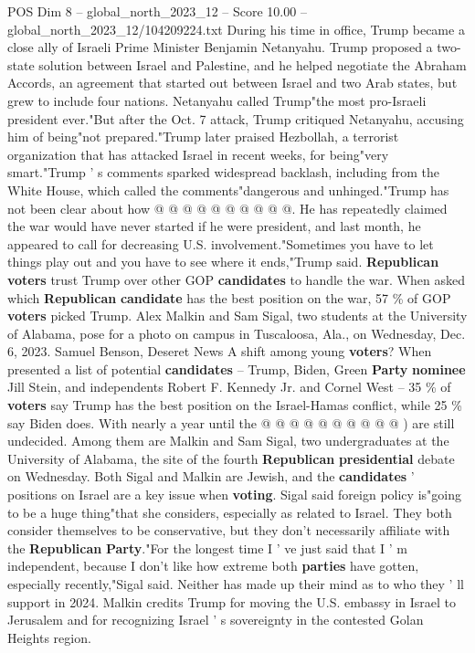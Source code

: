 \begin{textsample}{POS Dim 8 – global\_north\_2023\_12 – Score 10.00 – global\_north\_2023\_12/104209224.txt}
During his time in office, Trump became a close ally of Israeli Prime Minister Benjamin Netanyahu.
Trump proposed a two-state solution between Israel and Palestine, and he helped negotiate the Abraham Accords, an agreement that started out between Israel and two Arab states, but grew to include four nations.
Netanyahu called Trump"the most pro-Israeli president ever."But after the Oct. 7 attack, Trump critiqued Netanyahu, accusing him of being"not prepared."Trump later praised Hezbollah, a terrorist organization that has attacked Israel in recent weeks, for being"very smart."Trump ' s comments sparked widespread backlash, including from the White House, which called the comments"dangerous and unhinged."Trump has not been clear about how @ @ @ @ @ @ @ @ @ @.
He has repeatedly claimed the war would have never started if he were president, and last month, he appeared to call for decreasing U.S. involvement."Sometimes you have to let things play out and you have to see where it ends,"Trump said. \textbf{Republican} \textbf{voters} trust Trump over other GOP \textbf{candidates} to handle the war.
When asked which \textbf{Republican} \textbf{candidate} has the best position on the war, 57 \% of GOP \textbf{voters} picked Trump.
Alex Malkin and Sam Sigal, two students at the University of Alabama, pose for a photo on campus in Tuscaloosa, Ala., on Wednesday, Dec. 6, 2023.
Samuel Benson, Deseret News A shift among young \textbf{voters}?
When presented a list of potential \textbf{candidates} -- Trump, Biden, Green \textbf{Party} \textbf{nominee} Jill Stein, and independents Robert F.
Kennedy Jr. and Cornel West -- 35 \% of \textbf{voters} say Trump has the best position on the Israel-Hamas conflict, while 25 \% say Biden does.
With nearly a year until the @ @ @ @ @ @ @ @ @ @ ) are still undecided.
Among them are Malkin and Sam Sigal, two undergraduates at the University of Alabama, the site of the fourth \textbf{Republican} \textbf{presidential} debate on Wednesday.
Both Sigal and Malkin are Jewish, and the \textbf{candidates} ' positions on Israel are a key issue when \textbf{voting}.
Sigal said foreign policy is"going to be a huge thing"that she considers, especially as related to Israel.
They both consider themselves to be conservative, but they don't necessarily affiliate with the \textbf{Republican} \textbf{Party}."For the longest time I ' ve just said that I ' m independent, because I don't like how extreme both \textbf{parties} have gotten, especially recently,"Sigal said.
Neither has made up their mind as to who they ' ll support in 2024.
Malkin credits Trump for moving the U.S. embassy in Israel to Jerusalem and for recognizing Israel ' s sovereignty in the contested Golan Heights region.

\end{textsample}
